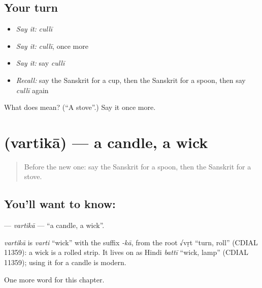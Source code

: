 \subsection*{Your turn}
\begin{itemize}
\raggedright
  \item \emph{Say it:} \emph{cullī}
  \item \emph{Say it:} \emph{cullī}, once more
  \item \emph{Say it:} say \emph{cullī}
  \item \emph{Recall:} say the Sanskrit for a cup, then the Sanskrit for a spoon, then say \emph{cullī} again
\end{itemize}

\begin{tcolorbox}[breakable,colback=teal!4,colframe=teal!35!black,title={Before you move on}]
What does  mean? (\textquotedblleft{}A stove\textquotedblright{}.) Say it once more.
\end{tcolorbox}
\section[\texorpdfstring{\sk{वर्तिका} (vartikā)}{वर्तिका (vartikā)}]{ (vartikā) — a candle, a wick}

\label{lesson:SA-C102-vartika}



\begin{quote}
Before the new one: say the Sanskrit for a spoon, then the Sanskrit for a stove.
\end{quote}

\subsection*{You'll want to know: }
\textbf{} — \emph{vartikā} — \textquotedblleft{}a candle, a wick\textquotedblright{}.

\begin{cousinweb}
\emph{vartikā} is \emph{varti} \textquotedblleft{}wick\textquotedblright{} with the suffix \emph{-kā}, from the root √vṛt \textquotedblleft{}turn, roll\textquotedblright{} (CDIAL 11359): a wick is a rolled strip. It lives on as Hindi \emph{battī} \textquotedblleft{}wick, lamp\textquotedblright{} (CDIAL 11359); using it for a candle is modern.
\end{cousinweb}

\begin{grammarlens}[title={What you've built}]
One more word for this chapter.
\end{grammarlens}

